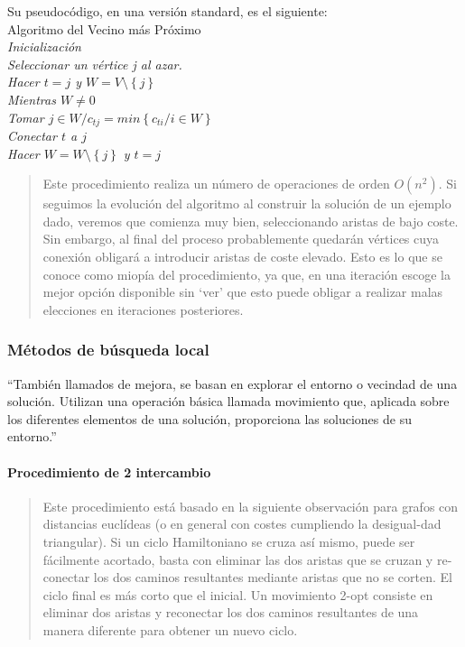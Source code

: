 Su pseudocódigo, en una versión standard, es el siguiente:
\\Algoritmo del Vecino más Próximo \\
\textit{
Inicialización \\
\hspace{10mm}Seleccionar un vértice j al azar. \\
\hspace{10mm}Hacer $t = j$ y $W = V \setminus \left \{ j \right \}$\\
Mientras $W\neq0$ \\
\hspace{10mm}Tomar $j\in W/c_{tj}=min\left \{ c_{ti} /i\in W \right \}$ \\
\hspace{10mm}Conectar $t$ a $j$ \\
\hspace{10mm}Hacer $W = W \setminus \left \{ j \right \}$ y $t=j$ \\
}
\begin{quote}Este procedimiento realiza un número de operaciones de orden $O(n^{2})$. Si seguimos la evolución del algoritmo al construir la solución de un ejemplo dado, veremos que comienza muy bien, seleccionando aristas de bajo coste. Sin embargo, al final del proceso probablemente quedarán vértices cuya conexión obligará a introducir aristas de coste elevado. Esto es lo que se conoce como miopía del procedimiento, ya que, en una iteración escoge la mejor opción disponible sin ‘ver’ que esto puede obligar a realizar malas elecciones en iteraciones posteriores.\cite{MartiProcedimientosCombinatoria}\end{quote}
\subsubsection{Métodos de búsqueda local}
“También llamados de mejora, se basan en explorar el entorno o vecindad de una solución. Utilizan una operación básica llamada movimiento que, aplicada sobre los diferentes elementos de una solución, proporciona las soluciones de su entorno.” \cite{MartiProcedimientosCombinatoria}

\paragraph{Procedimiento de 2 intercambio}
\begin{quote}Este procedimiento está basado en la siguiente observación para grafos con distancias euclídeas (o en general con costes cumpliendo la desigual-dad triangular). Si un ciclo Hamiltoniano se cruza así mismo, puede ser fácilmente acortado, basta con eliminar las dos aristas que se cruzan y re-conectar los dos caminos resultantes mediante aristas que no se corten. El ciclo final es más corto que el inicial. Un movimiento 2-opt consiste en eliminar dos aristas y reconectar los dos caminos resultantes de una manera diferente para obtener un nuevo ciclo. \cite{MartiProcedimientosCombinatoria}\end{quote}

